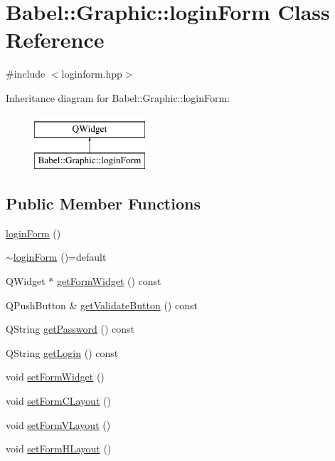\hypertarget{classBabel_1_1Graphic_1_1loginForm}{}\section{Babel\+:\+:Graphic\+:\+:login\+Form Class Reference}
\label{classBabel_1_1Graphic_1_1loginForm}


{\ttfamily \#include $<$loginform.\+hpp$>$}

Inheritance diagram for Babel\+:\+:Graphic\+:\+:login\+Form\+:\begin{figure}[H]
\begin{center}
\leavevmode
\includegraphics[height=2.000000cm]{classBabel_1_1Graphic_1_1loginForm}
\end{center}
\end{figure}
\subsection*{Public Member Functions}
\begin{DoxyCompactItemize}
\item 
\hyperlink{classBabel_1_1Graphic_1_1loginForm_ab46f1812bee0064df6da21ccf3026294}{login\+Form} ()
\item 
\hyperlink{classBabel_1_1Graphic_1_1loginForm_a6eab15e7d73844e83eead5533479344e}{$\sim$login\+Form} ()=default
\item 
Q\+Widget $\ast$ \hyperlink{classBabel_1_1Graphic_1_1loginForm_aac5f902c1d18ad4ece18259ce9c66f9a}{get\+Form\+Widget} () const
\item 
Q\+Push\+Button \& \hyperlink{classBabel_1_1Graphic_1_1loginForm_a97ea96811bf14e3bd6ea761a013ea862}{get\+Validate\+Button} () const
\item 
Q\+String \hyperlink{classBabel_1_1Graphic_1_1loginForm_a14551cacf07fb0f7f23db6348270b73f}{get\+Password} () const
\item 
Q\+String \hyperlink{classBabel_1_1Graphic_1_1loginForm_a4fa611a689151fbae9a075c3a8a7d6fd}{get\+Login} () const
\item 
void \hyperlink{classBabel_1_1Graphic_1_1loginForm_aa2292182ad4bc5760fd4d7f207a829c1}{set\+Form\+Widget} ()
\item 
void \hyperlink{classBabel_1_1Graphic_1_1loginForm_a90f3c61573b0c97b7143d3277c56e127}{set\+Form\+C\+Layout} ()
\item 
void \hyperlink{classBabel_1_1Graphic_1_1loginForm_ab3fea0dca38e526549522d740594d4a9}{set\+Form\+V\+Layout} ()
\item 
void \hyperlink{classBabel_1_1Graphic_1_1loginForm_a5ff5ffbcedc521c0a6428c679765e7aa}{set\+Form\+H\+Layout} ()
\end{DoxyCompactItemize}


